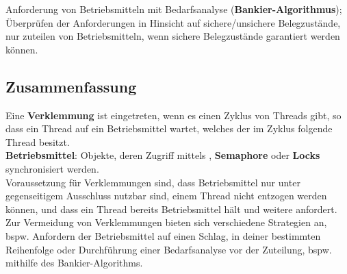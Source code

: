 \noindent
Anforderung von Betriebsmitteln mit Bedarfsanalyse (\textbf{Bankier-Algorithmus}); Überprüfen der Anforderungen in Hinsicht auf sichere/unsichere Belegzustände, nur zuteilen von Betriebsmitteln, wenn sichere Belegzustände garantiert werden können.


\subsection{Zusammenfassung}
Eine \textbf{Verklemmung} ist eingetreten, wenn es einen Zyklus von Threads gibt, so dass ein Thread auf ein Betriebsmittel wartet, welches der im Zyklus folgende Thread besitzt.\\

\noindent
\textbf{Betriebsmittel}: Objekte, deren Zugriff mittels , \textbf{Semaphore} oder \textbf{Locks} synchronisiert werden.\\

\noindent
Voraussetzung für Verklemmungen sind, dass Betriebsmittel nur unter gegenseitigem Ausschluss nutzbar sind, einem Thread nicht entzogen werden können, und dass ein Thread bereits Betriebsmittel hält und weitere anfordert.\\

\noindent
Zur Vermeidung von Verklemmungen bieten sich verschiedene Strategien an, {bspw.} Anfordern der Betriebsmittel auf einen Schlag, in deiner bestimmten Reihenfolge oder Durchführung einer Bedarfsanalyse vor der Zuteilung, {bspw.} mithilfe des Bankier-Algorithms.
